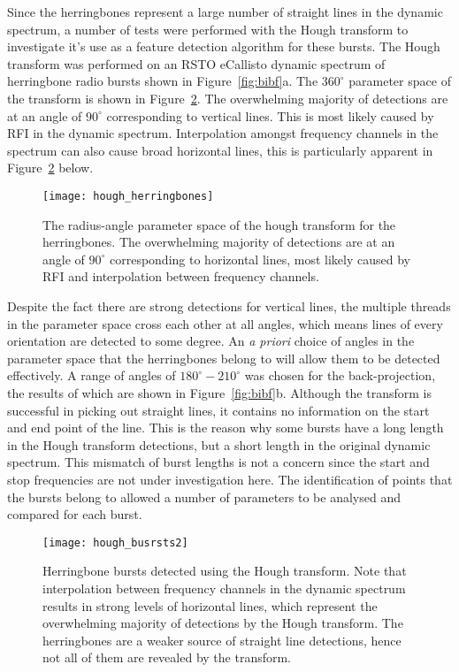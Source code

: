 %
%
Since the herringbones represent a large number of straight lines in the dynamic spectrum, a number of tests were performed with the Hough transform to investigate it's use as a feature detection algorithm for these bursts. The Hough transform was performed on an RSTO eCallisto dynamic spectrum of herringbone radio bursts shown in Figure~\ref{fig:bibf}a. The $360^{\circ}$ parameter space of the transform is shown in Figure~\ref{fig:hough_hb}. The overwhelming majority of detections are at an angle of $90^{\circ}$ corresponding to vertical lines. This is most likely caused by RFI in the dynamic spectrum. Interpolation amongst frequency channels in the spectrum can also cause broad horizontal lines, this is particularly apparent in Figure~\ref{fig:hough_hb} below.
%
% 
\begin{figure}[t!]
\begin{center}
\texttt{[image: hough\_herringbones]}
\caption[Hough transform]{The radius-angle parameter space of the hough transform for the herringbones. The overwhelming majority of detections are at an angle of $90^{\circ}$ corresponding to horizontal lines, most likely caused by RFI and interpolation between frequency channels.}
\label{fig:hough_hb}
\end{center}
\end{figure}
%
%
Despite the fact there are strong detections for vertical lines, the multiple threads in the parameter space cross each other at all angles, which means lines of every orientation are detected to some degree. An {\it a priori} choice of angles in the parameter space that the herringbones belong to will allow them to be detected effectively. A range of angles of $180^{\circ}-210^{\circ}$ was chosen for the back-projection, the results of which are shown in Figure~\ref{fig:bibf}b. Although the transform is successful in picking out straight lines, it contains no information on the start and end point of the line. This is the reason why some bursts have a long length in the Hough transform detections, but a short length in the original dynamic spectrum. This mismatch of burst lengths is not a concern since the start and stop frequencies are not under investigation here. The identification of points that the bursts belong to allowed a number of parameters to be analysed and compared for each burst.
%
%
\begin{figure}[t!]
\begin{center}
\texttt{[image: hough\_busrsts2]}
\caption[Hough transform herringbones]{Herringbone bursts detected using the Hough transform. Note that interpolation between frequency channels in the dynamic spectrum results in strong levels of horizontal lines, which represent the overwhelming majority of detections by the Hough transform. The herringbones are a weaker source of straight line detections, hence not all of them are revealed by the transform.}
\label{fig:hough_hb}
\end{center}
\end{figure}
